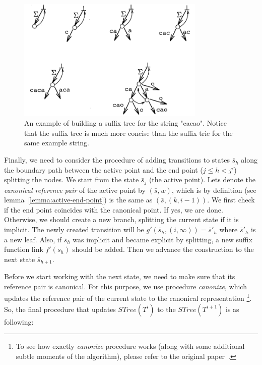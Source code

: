 \documentclass[paper=a4, fontsize=11pt]{scrartcl} %
\numberwithin{equation}{section} %
\numberwithin{figure}{section} %
\numberwithin{table}{section} %
\begin{document}
\begin{figure}[h!]
\centering
\includegraphics[width=0.8\textwidth]{figures/suffix-tree-eg.png}
\caption{An example of building a suffix tree for the string "cacao". Notice that the suffix tree is much more concise than the suffix trie for the same example string.}
\label{fig:siffix-tree}
\end{figure}

Finally, we need to consider the procedure of adding transitions to states $\bar s_h$ along the boundary path between the active point and the end point ($j \le h < j'$) splitting the nodes. We start from the state $\bar s_j$ (the active point). Lets denote the \textit{canonical reference pair} of the active point by $(\bar s, w)$, which is by definition (see lemma~\ref{lemma:active-end-point}) is the same as $(\bar s, (k, i-1))$. We first check if the end point coincides with the canonical point. If yes, we are done. Otherwise, we should create a new branch, splitting the current state if it is implicit. The newly created transition will be $g'(\bar s_h, (i, \infty)) = \bar s'_h$ where $\bar s'_h$ is a new leaf. Also, if $\bar s_h$ was implicit and became explicit by splitting, a new suffix function link $f'(s_h)$ should be added. Then we advance the construction to the next state $\bar s_{h+1}$.

Before we start working with the next state, we need to make sure that its reference pair is canonical. For this purpose, we use procedure \textit{canonize}, which updates the reference pair of the current state to the canonical representation \footnote{To see how exactly \textit{canonize} procedure works (along with some additional subtle moments of the algorithm), please refer to the original paper~\cite{ukkonen1995line}.}. So, the final procedure that updates $STree(T^i)$ to the $STree(T^{i+1})$ is as following:
\end{document}
